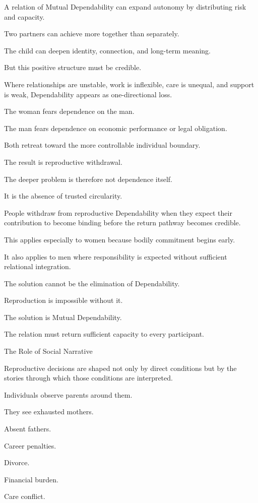 A relation of Mutual Dependability can expand autonomy by distributing risk and capacity.

Two partners can achieve more together than separately.

The child can deepen identity, connection, and long-term meaning.

But this positive structure must be credible.

Where relationships are unstable, work is inflexible, care is unequal, and support is weak, Dependability appears as one-directional loss.

The woman fears dependence on the man.

The man fears dependence on economic performance or legal obligation.

Both retreat toward the more controllable individual boundary.

The result is reproductive withdrawal.

The deeper problem is therefore not dependence itself.

It is the absence of trusted circularity.

People withdraw from reproductive Dependability when they expect their contribution to become binding before the return pathway becomes credible.

This applies especially to women because bodily commitment begins early.

It also applies to men where responsibility is expected without sufficient relational integration.

The solution cannot be the elimination of Dependability.

Reproduction is impossible without it.

The solution is Mutual Dependability.

The relation must return sufficient capacity to every participant.

The Role of Social Narrative

Reproductive decisions are shaped not only by direct conditions but by the stories through which those conditions are interpreted.

Individuals observe parents around them.

They see exhausted mothers.

Absent fathers.

Career penalties.

Divorce.

Financial burden.

Care conflict.

